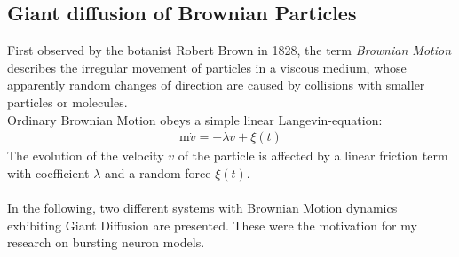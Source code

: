 \documentclass[12pt,a4paper]{article}
\begin{document}
\subsection{Giant diffusion of Brownian Particles}
First observed by the botanist Robert Brown in 1828\cite{bm}, the term \textit{Brownian Motion} describes the irregular movement of particles in a viscous medium, whose apparently random changes of direction are caused by collisions with smaller particles or molecules.
\\
Ordinary Brownian Motion obeys a simple linear Langevin-equation:
\begin{align*}
\text{m}\dot{v}=-\lambda v+\xi(t)
\end{align*}
The evolution of the velocity $v$ of the particle is affected by a linear friction term with coefficient $\lambda$ and a random force $\xi(t)$. \\
\\ 
In the following, two different systems with Brownian Motion dynamics exhibiting Giant Diffusion are presented. These were the motivation for my research on bursting neuron models.
\end{document}
